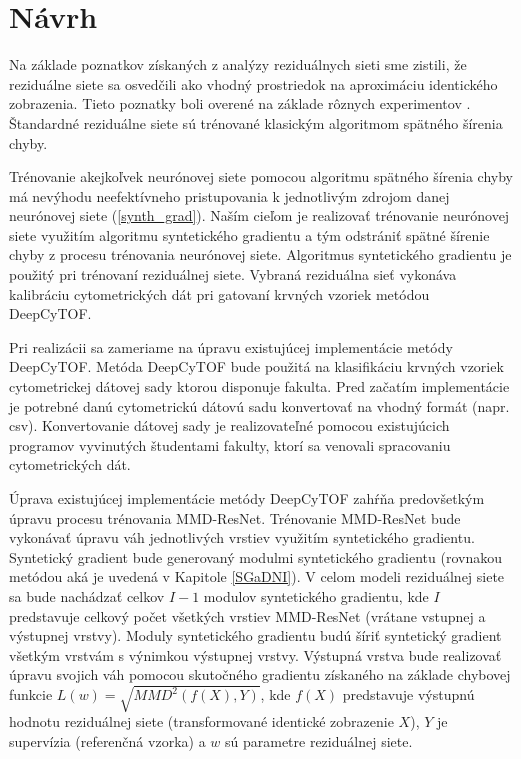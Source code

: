 \chapter{Návrh}  %
\label{navrh}

Na základe poznatkov získaných z analýzy reziduálnych sieti sme zistili, že reziduálne siete sa osvedčili ako vhodný prostriedok na aproximáciu identického zobrazenia. Tieto poznatky boli overené na základe rôznych experimentov \cite{Targ2016, He2016, Wu2017}. Štandardné reziduálne siete sú trénované klasickým algoritmom spätného šírenia chyby.

Trénovanie akejkoľvek neurónovej siete pomocou algoritmu spätného šírenia chyby má nevýhodu neefektívneho pristupovania k jednotlivým zdrojom danej neurónovej siete (\ref{synth_grad}). Naším cieľom je realizovať trénovanie neurónovej siete využitím algoritmu syntetického gradientu a tým odstrániť spätné šírenie chyby z procesu trénovania neurónovej siete. Algoritmus syntetického gradientu je použitý pri trénovaní reziduálnej siete. Vybraná reziduálna sieť vykonáva kalibráciu cytometrických dát pri gatovaní krvných vzoriek metódou DeepCyTOF.

Pri realizácii sa zameriame na úpravu existujúcej implementácie metódy DeepCyTOF. Metóda DeepCyTOF bude použitá na klasifikáciu krvných vzoriek cytometrickej dátovej sady ktorou disponuje fakulta. Pred začatím implementácie je potrebné danú cytometrickú dátovú sadu konvertovať na vhodný formát (napr. csv). Konvertovanie dátovej sady je realizovateľné pomocou existujúcich programov vyvinutých študentami fakulty, ktorí sa venovali spracovaniu cytometrických dát.

Úprava existujúcej implementácie metódy DeepCyTOF zahŕňa predovšetkým úpravu procesu trénovania MMD-ResNet. Trénovanie MMD-ResNet bude vykonávať úpravu váh jednotlivých vrstiev využitím syntetického gradientu. Syntetický gradient bude generovaný modulmi syntetického gradientu (rovnakou metódou aká je uvedená v Kapitole \ref{SGaDNI}). V celom modeli reziduálnej siete sa bude nachádzať celkov $I-1$ modulov syntetického gradientu, kde $I$ predstavuje celkový počet všetkých vrstiev MMD-ResNet (vrátane vstupnej a výstupnej vrstvy). Moduly syntetického gradientu budú šíriť syntetický gradient všetkým vrstvám s výnimkou výstupnej vrstvy. Výstupná vrstva bude realizovať úpravu svojich váh pomocou skutočného gradientu získaného na základe chybovej funkcie $L(w) = \sqrt{MMD^2(f(X),Y)}$, kde $f(X)$ predstavuje výstupnú hodnotu reziduálnej siete (transformované identické zobrazenie $X$), $Y$ je supervízia (referenčná vzorka) a $w$ sú parametre reziduálnej siete.


